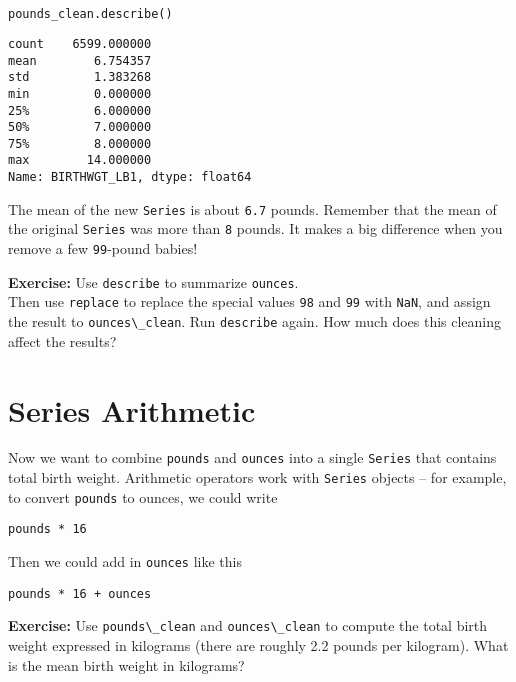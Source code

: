\begin{lstlisting}[language=Python,style=source]
pounds_clean.describe()
\end{lstlisting}

\begin{lstlisting}[style=output]
count    6599.000000
mean        6.754357
std         1.383268
min         0.000000
25%         6.000000
50%         7.000000
75%         8.000000
max        14.000000
Name: BIRTHWGT_LB1, dtype: float64
\end{lstlisting}

The mean of the new \passthrough{\lstinline!Series!} is about
\passthrough{\lstinline!6.7!} pounds. Remember that the mean of the
original \passthrough{\lstinline!Series!} was more than
\passthrough{\lstinline!8!} pounds. It makes a big difference when you
remove a few \passthrough{\lstinline!99!}-pound babies!

\textbf{Exercise:} Use \passthrough{\lstinline!describe!} to summarize
\passthrough{\lstinline!ounces!}.\\
Then use \passthrough{\lstinline!replace!} to replace the special values
\passthrough{\lstinline!98!} and \passthrough{\lstinline!99!} with
\passthrough{\lstinline!NaN!}, and assign the result to
\passthrough{\lstinline!ounces\_clean!}. Run
\passthrough{\lstinline!describe!} again. How much does this cleaning
affect the results?

\hypertarget{series-arithmetic}{%
\section{Series Arithmetic}\label{series-arithmetic}}

Now we want to combine \passthrough{\lstinline!pounds!} and
\passthrough{\lstinline!ounces!} into a single
\passthrough{\lstinline!Series!} that contains total birth weight.
Arithmetic operators work with \passthrough{\lstinline!Series!} objects
-- for example, to convert \passthrough{\lstinline!pounds!} to ounces,
we could write

\passthrough{\lstinline!pounds * 16!}

Then we could add in \passthrough{\lstinline!ounces!} like this

\passthrough{\lstinline!pounds * 16 + ounces!}

\textbf{Exercise:} Use \passthrough{\lstinline!pounds\_clean!} and
\passthrough{\lstinline!ounces\_clean!} to compute the total birth
weight expressed in kilograms (there are roughly 2.2 pounds per
kilogram). What is the mean birth weight in kilograms?

